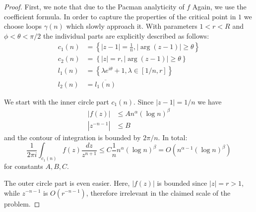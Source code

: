 \begin{proof}
First, we note that due to the Pacman analyticity of $f$
Again, we use the coefficient formula.
In order to capture the properties of the critical point in $1$ we choose loops $\gamma(n)$ which slowly approach it.
With parameters $1 < r < R$ and $\phi < \theta < \pi/2$ the individual parts are explicitly described as follows:
\begin{align*}
    c_1(n) &= \left\{ |z-1| = \frac{1}{n}, |\arg(z-1)| \geq \theta \right\} \\
    c_2(n) &= \left\{ |z| = r, |\arg(z-1)| \geq \theta \right\} \\
    l_1(n) &= \left\{ \lambda e^{i \theta} + 1, \lambda \in [1/n, r] \right\} \\
    l_2(n) &= \overline{l_1(n)}
\end{align*}

We start with the inner circle part $c_1(n)$.
Since $|z-1| = 1/n$ we have
\begin{align*}
    |f(z)| &\leq A n^\alpha (\log n)^\beta \\
    |z^{-n-1}| &\leq B
\end{align*}
and the contour of integration is bounded by $2\pi/n$.
In total:
\begin{equation*}
    \frac{1}{2 \pi i} \int_{c_1(n)} f(z) \frac{dz}{z^{n+1}}
    \leq C \frac{1}{n} n^\alpha (\log n)^\beta
    = O({n^{\alpha - 1} (\log n)^\beta})
\end{equation*}
for constants $A, B, C$.

The outer circle part is even easier. Here, $|f(z)|$ is bounded since $|z| = r > 1$, while $z^{-n-1}$ is $O(r^{-n-1})$, therefore irrelevant in the claimed scale of the problem.


\end{proof}

